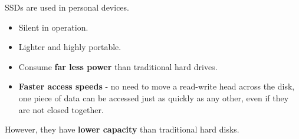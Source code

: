 SSDs are used in personal devices.
\begin{itemize}
    \item Silent in operation.
    \item Lighter and highly portable.
    \item Consume \textbf{far less power} than traditional hard drives.
    \item \textbf{Faster access speeds} - no need to move a read-write head across the disk, one piece of data can be accessed just as quickly as any other, even if they are not closed together.
\end{itemize}

However, they have \textbf{lower capacity} than traditional hard disks.
